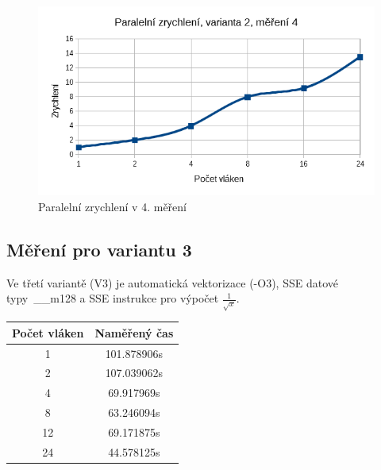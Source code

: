 \documentclass[12pt]{article}
\begin{document}
\begin{figure}[H]
  \begin{center}
     \includegraphics[width=12cm]{images/sse4acc.png}
    \caption{Paralelní zrychlení v 4. měření} 
  \end{center}
\end{figure}

\subsection{Měření pro variantu 3}
Ve třetí variantě (V3) je automatická vektorizace (-O3), SSE datové typy~\_\_m128 a SSE in\-struk\-ce pro výpočet ${\frac{1}{\sqrt{x}}}$.
%
%
\begin{center}
\begin{tabular}{ c | c }
\textbf{Počet vláken} & \textbf{Naměřený čas} \\ \hline \hline 
1 & 101.878906s \\ \hline
2 & 107.039062s \\ \hline
4 & 69.917969s \\ \hline
8 & 63.246094s \\ \hline
12 & 69.171875s \\ \hline
24 & 44.578125s \\ \hline
\end{tabular}
\end{center}
\end{document}

